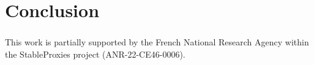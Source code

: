 \documentclass[runningheads]{llncs}
\begin{document}
    \section{Conclusion}


    \begin{credits}
        \subsubsection{\ackname}
        This work is partially supported by the French National Research Agency
        within the StableProxies project (ANR-22-CE46-0006).
    \end{credits}
%
%
%
    
    
\end{document}
